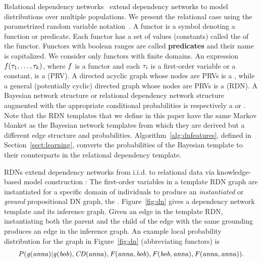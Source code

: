 \documentclass[runningheads,a4paper]{llncs}
\newcommand{\iid}{i.i.d.}
\begin{document}
Relational dependency networks~\cite{Neville2007} extend dependency networks to model distributions over multiple populations.
We  present the relational case using the parametrized random variable notation~\cite{Kimmig2014}.
A functor is a symbol denoting a function or predicate. Each functor has a set of values (constants) called the  of the functor. Functors with boolean ranges are called \textbf{predicates} and their name is capitalized. We consider only functors with finite domains. An expression $f(\tau_{1},\ldots,\tau_{k})$, where $f$ is a functor 
and each $\tau_{i}$ is a first-order variable or a constant, is a  (PRV).
A directed acyclic graph whose nodes are PRVs is a , while a general (potentially cyclic) directed graph whose nodes are PRVs is a  (RDN). A Bayesian network structure or relational dependency network structure augmented with the appropriate conditional probabilities is  respectively a  or .  Note that the RDN templates that we define in this paper have the same Markov blanket as the Bayesian network templates from which they are derived but a different edge structure and probabilities. Algorithm~\ref{alg:dnfeatures}, defined in Section~\ref{sect:learning}, converts the probabilities of the Bayesian template to their counterparts in the relational dependency template. 

RDNs extend dependency networks from \iid{} to relational data via knowledge-based model construction \cite{Neville2007}:
The first-order variables in a template RDN graph are instantiated for a specific domain of individuals to produce an {\em  instantiated} or {\em ground} propositional DN graph, the . Figure~\ref{fig:dn} gives a dependency network template and its  inference graph. Given an edge in the template RDN, instantiating both the parent and the child of the edge with the same grounding produces an edge in the inference graph. An example local probability distribution for the graph in Figure~\ref{fig:dn} (abbreviating functors) is
$$P(\it{g(anna)}|\it{g(bob)}, \it{CD(anna)}, \it{F(anna,bob)},\it{F(bob,anna)},\it{F(anna,anna)}).$$
\end{document}
